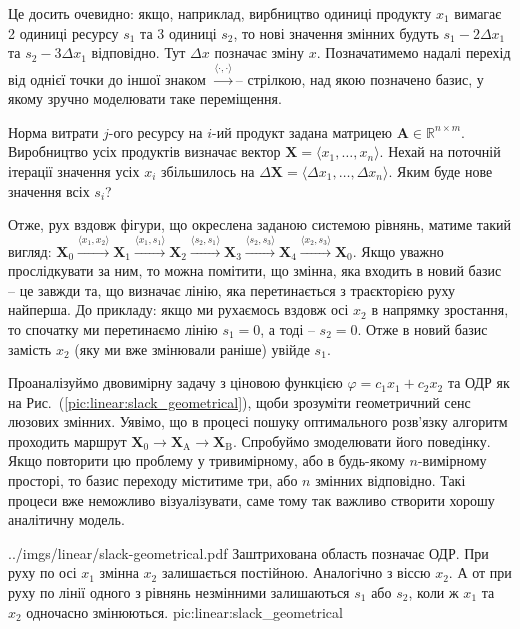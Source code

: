 \documentclass[\main/book.tex]{subfiles}
\begin{document}
\begin{note}
 Це досить очевидно: якщо, наприклад, вирбництво одиниці продукту $x_1$ вимагає 2 одиниці ресурсу $s_1$ та 3 одиниці $s_2$, то нові значення змінних будуть $s_1 - 2 \Delta x_1$ та $s_2 - 3 \Delta x_1$ відповідно. Тут $\Delta x$ позначає зміну $x$.
 Позначатимемо надалі перехід від однієї точки до іншої знаком \flqq{}$\overset{\langle \cdot, \cdot \rangle}{\rightarrow}$\frqq -- стрілкою, над якою позначено базис, у якому зручно моделювати таке переміщення.
\end{note}

\begin{question}
 Норма витрати $j$-ого ресурсу на $i$-ий продукт задана матрицею ${\mathbf{A} \in \mathbb{R}^{n \times m}}$. Виробництво усіх продуктів визначає вектор $\mathbf{X} = \langle x_1, \ldots, x_n \rangle$. Нехай на поточній ітерації значення усіх $x_i$ збільшилось на $\Delta \mathbf{X} = \langle \Delta x_1, \ldots, \Delta x_n \rangle$. Яким буде нове значення всіх $s_i$?
\end{question}
Отже, рух вздовж фігури, що окреслена заданою системою рівнянь, матиме такий вигляд:
$
\mathbf{X}_0
\overset{\langle x_1, x_2 \rangle}{\rightarrow}
\mathbf{X}_1
\overset{\langle x_1, s_1 \rangle}{\rightarrow}
\mathbf{X}_2
\overset{\langle s_2, s_1 \rangle}{\rightarrow}
\mathbf{X}_3
\overset{\langle s_2, s_3 \rangle}{\rightarrow}
\mathbf{X}_4
\overset{\langle x_2, s_3 \rangle}{\rightarrow}
\mathbf{X}_0
$. Якщо уважно прослідкувати за ним, то можна помітити, що змінна, яка входить в новий базис -- це завжди та, що визначає лінію, яка перетинається з траєкторією руху найперша. До прикладу: якщо ми рухаємось вздовж осі $x_2$ в напрямку зростання, то спочатку ми перетинаємо лінію $s_1 = 0$, а тоді -- $s_2 = 0$. Отже в новий базис замість $x_2$ (яку ми вже змінювали раніше) увійде $s_1$.

Проаналізуймо двовимірну задачу з ціновою функцією $\varphi = c_1 x_1 + c_2 x_2$ та ОДР як на Рис.~(\ref{pic:linear:slack_geometrical}), щоби зрозуміти геометричний сенс люзових змінних. Уявімо, що в процесі пошуку оптимального розв'язку алгоритм проходить маршрут $\mathbf{X}_0 \rightarrow \mathbf{X}_\mathrm{A} \rightarrow \mathbf{X}_\mathrm{B}$. Спробуймо змоделювати його поведінку.
Якщо повторити цю проблему у тривимірному, або в будь-якому $n$-вимірному просторі, то базис переходу міститиме три, або $n$ змінних відповідно. Такі процеси вже неможливо візуалізувати, саме тому так важливо створити хорошу аналітичну модель.

\illustration
 {../imgs/linear/slack-geometrical.pdf}
 {Заштрихована область позначає ОДР. При руху по осі $x_1$ змінна $x_2$ залишається постійною. Аналогічно з віссю $x_2$. А от при руху по лінії одного з рівнянь незмінними залишаються $s_1$ або $s_2$, коли ж $x_1$ та $x_2$ одночасно змінюються.}
 {pic:linear:slack_geometrical}
\end{document}
